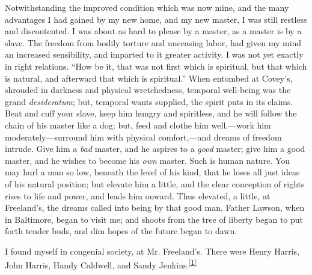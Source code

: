 Notwithstanding the improved condition which was now mine, and the many
advantages I had gained by my new home, and my new master, I was still
restless and discontented. I was about as hard to please by a master, as
a master is by a slave. The freedom from bodily torture and unceasing
labor, had given my mind an increased sensibility, and imparted to it
greater activity. I was not yet exactly in right relations. ``How be it,
that was not first which is spiritual, but that which is natural, and
afterward that which is spiritual.'' When entombed at Covey's, shrouded
in darkness and physical wretchedness, temporal well-being was the grand
\emph{desideratum}; but, temporal wants supplied, the spirit puts in its
claims. Beat and cuff your slave, keep him hungry and spiritless, and he
will follow the chain of his master like a dog; but, feed and clothe him
well,---work him moderately---surround him with physical comfort,---and
dreams of freedom intrude. Give him a \emph{bad} master, and he aspires
to a \emph{good} master; give him a good master, and he wishes to become
his \emph{own} master. Such is human nature. You may hurl a man so low,
beneath the level of his kind, that he loses all just ideas of his
natural position; but elevate him a little, and
{\protect\hypertarget{264}{}{}}the clear conception of rights rises to
life and power, and leads him onward. Thus elevated, a little, at
Freeland's, the dreams called into being by that good man, Father
Lawson, when in Baltimore, began to visit me; and shoots from the tree
of liberty began to put forth tender buds, and dim hopes of the future
began to dawn.

I found myself in congenial society, at Mr. Freeland's. There were Henry
Harris, John Harris, Handy Caldwell, and Sandy
Jenkins.\textsuperscript{\protect\hyperlink{cite_note-1}{{[}1{]}}}

